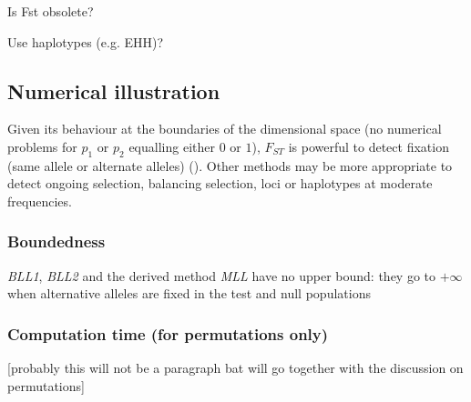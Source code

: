 \documentclass{bmcart}
\begin{document}
Is Fst obsolete?

Use haplotypes (e.g. EHH)?

\subsection*{Numerical illustration}

Given its behaviour at the boundaries of the dimensional space (no
numerical problems for $p_1$ or $p_2$ equalling either $0$ or $1$), $F_{ST}$
is powerful to detect fixation (same allele or alternate alleles)
(\cite{biswas2006genomic}). Other methods may be more appropriate to
detect ongoing selection, balancing selection, loci or haplotypes at
moderate frequencies.

\subsubsection*{Boundedness}
\emph{BLL1}, \emph{BLL2} and the derived method \emph{MLL} have no upper
bound: they go to $+\infty$ when alternative alleles are fixed in the
test and null populations

\subsubsection*{Computation time (for permutations only)}
[probably this will not be a paragraph bat will go together with the
discussion on permutations]
\end{document}
